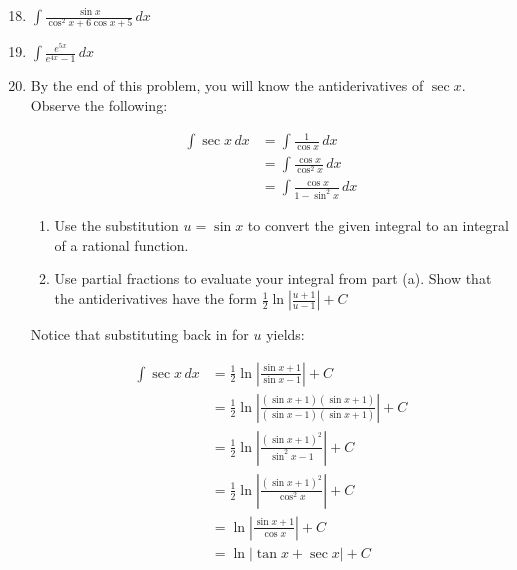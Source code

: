 \documentclass[12pt]{article}
\newif\ifans
\begin{document}
\begin{enumerate}
\setcounter{enumi}{17}

\item $\int \frac{\sin{x}}{\cos^2{x}+6\cos{x}+5} \,dx$

\ifans{\fbox{$\ln{|\cos{x}+3|}-\ln{|\cos{x}+2|}+C$}} \fi

\item $\int \frac{e^{5x}}{e^{4x}-1} \,dx$

\ifans{\fbox{$e^{x}+\frac{1}{4}\ln|e^x-1|-\frac{1}{4}\ln(e^x+1)-\frac{1}{2}\tan^{-1}(e^x)+C$}} \fi

\item By the end of this problem, you will know the antiderivatives of $\sec{x}$.  Observe the following:
\begin{center}
\begin{align*}
\int \sec{x} \,dx &= \int \frac{1}{\cos{x}} \,dx\\
&= \int \frac{\cos{x}}{\cos^2{x}} \,dx\\
&= \int \frac{\cos{x}}{1-\sin^2{x}} \,dx
\end{align*}
\end{center}
\begin{enumerate}

\item Use the substitution $u=\sin{x}$ to convert the given integral to an integral of a rational function.  

\ifans{\fbox{$\int \frac{1}{1-u^2} \,du$}} \fi

\item Use partial fractions to evaluate your integral from part (a).  Show that the antiderivatives have the form $\frac{1}{2}\ln{\left|\frac{u+1}{u-1}\right|}+C$

\ifans{\fbox{\parbox{1\linewidth}{
\begin{align*}
\int \frac{1}{u^2-1}\,du &= \int \frac{1}{2}\left(\frac{1}{u-1}\right)-\frac{1}{2}\left(\frac{1}{u+1}\right) \,du\\
&=\frac{1}{2}\ln{|u+1|}-\frac{1}{2}\ln{|u-1|}+C\\
&=\frac{1}{2}\ln{\left|\frac{u+1}{u-1}\right|}+C
\end{align*}
}}} \fi

\end{enumerate}

Notice that substituting back in for $u$ yields:

\begin{center}
\begin{align*}
\int \sec{x} \,dx &= \frac{1}{2}\ln{\left|\frac{\sin{x}+1}{\sin{x}-1}\right|}+C\\
&=\frac{1}{2}\ln{\left|\frac{(\sin{x}+1)(\sin{x}+1)}{(\sin{x}-1)(\sin{x}+1)}\right|}+C\\
&=\frac{1}{2}\ln{\left|\frac{(\sin{x}+1)^2}{\sin^2{x}-1}\right|}+C\\
&=\frac{1}{2}\ln{\left|\frac{(\sin{x}+1)^2}{\cos^2{x}}\right|}+C\\
&=\ln{\left|\frac{\sin{x}+1}{\cos{x}}\right|}+C\\
&=\ln{\left|\tan{x}+\sec{x}\right|}+C
\end{align*}
\end{center}

\end{enumerate}
\end{document}
